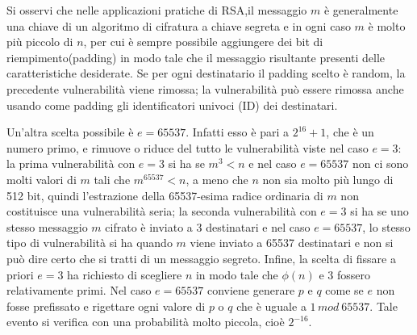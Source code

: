 Si osservi che nelle applicazioni pratiche di RSA,il messaggio $m$ è generalmente una chiave di un algoritmo di cifratura a chiave segreta e in ogni caso $m$ è molto più piccolo di $n$, per cui è sempre possibile aggiungere dei bit di riempimento(padding) in modo tale che il messaggio risultante presenti delle caratteristiche desiderate. Se per ogni destinatario il padding scelto è random, la precedente vulnerabilità viene rimossa; la vulnerabilità può essere rimossa anche usando come padding gli identificatori univoci (ID) dei
destinatari. 

Un'altra scelta possibile è $e=65537$. Infatti esso è pari a $2^{16}+1$, che è un numero primo, e rimuove o riduce del tutto le vulnerabilità viste nel caso $e=3$: la prima vulnerabilità con $e=3$ si ha se $m^3<n$ e nel caso $e=65537$ non ci sono molti valori di $m$ tali che $m^{65537} < n$, a meno che $n$ non sia molto più lungo di 512 bit, quindi l'estrazione della 65537-esima radice ordinaria di $m$ non costituisce una vulnerabilità seria; la seconda vulnerabilità con $e=3$ si ha se uno stesso messaggio $m$ cifrato è inviato a 3 destinatari e nel caso $e=65537$, lo stesso tipo di vulnerabilità si ha quando $m$ viene inviato a 65537 destinatari e non si può dire certo che si tratti di un messaggio segreto. Infine, la scelta di fissare a priori $e=3$ ha richiesto di scegliere $n$ in modo tale che $\phi(n)$ e 3 fossero relativamente primi. Nel caso $e=65537$ conviene generare $p$ e $q$ come se $e$ non fosse prefissato e rigettare ogni valore di $p$ o $q$ che è uguale a $1 \, mod \: 65537$. Tale evento si verifica con una probabilità molto piccola, cioè $2^{-16}$.

